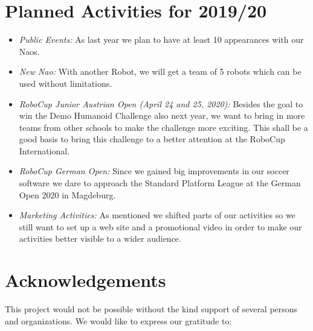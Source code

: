 \documentclass[11pt]{article}
\begin{document}
\section{Planned Activities for 2019/20}

\begin{itemize}
	\item {\em Public Events:}  As last year we plan to have at least 10 appearances with our Naos.
	
	\item {\em New Nao:} With another Robot, we will get a team of 5 robots which can be used without limitations.
	
	\item {\em RoboCup Junior Austrian Open (April 24 and 25, 2020):} Besides the goal to win the Demo Humanoid Challenge also next year, we want to bring in more teams from other schools to make the challenge more exciting. This shall be a good basis to bring this challenge to a better attention at the RoboCup International.
	
	\item {\em RoboCup German Open:} Since we gained big improvements in our soccer software we dare to approach the Standard Platform League at the German Open 2020 in Magdeburg.
	
	\item {\em Marketing Activities:} As mentioned we shifted parts of our activities so we still want to set up a web site and a promotional video in order to make our activities better visible to a wider audience.
\end{itemize}

\section{Acknowledgements}
This project would not be possible without the kind support of several persons and organizations. We would like to express our gratitude to:
\end{document}

